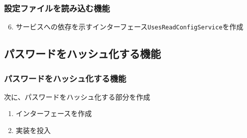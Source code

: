 \begin{frame}
  \frametitle{設定ファイルを読み込む機能}

  \begin{enumerate}
    \setcounter{enumi}{5}
    \item<1-> サービスへの依存を示すインターフェース\lstinline|UsesReadConfigService|を作成
      
  \end{enumerate}

  \begin{center}
  \end{center}
\end{frame}

\subsection{パスワードをハッシュ化する機能}

\begin{frame}
  \frametitle{パスワードをハッシュ化する機能}

  次に、パスワードをハッシュ化する部分を作成
  \begin{enumerate}
    \item<2-> インターフェースを作成
      
      \begin{center}
      \end{center}

    \item<4-> 実装を投入
      
  \end{enumerate}
\end{frame}

